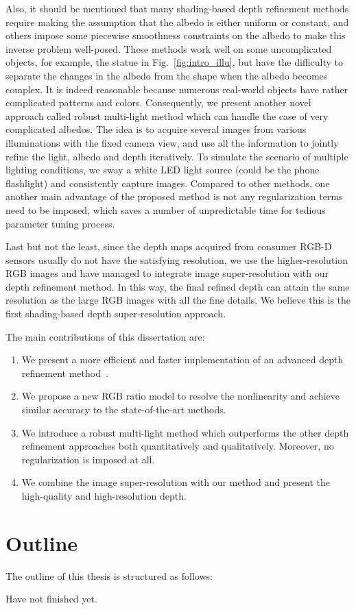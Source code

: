 Also, it should be mentioned that many shading-based depth refinement methods require making the assumption that the albedo is either uniform or constant, and others impose some piecewise smoothness constraints on the albedo to make this inverse problem well-posed.
These methods work well on some uncomplicated objects, for example, the statue in Fig.~\ref{fig:intro_illu}, but have the difficulty to separate the changes in the albedo from the shape when the albedo becomes complex.
It is indeed reasonable because numerous real-world objects have rather complicated patterns and colors.
Consequently, we present another novel approach called robust multi-light method which can handle the case of very complicated albedos.
The idea is to acquire several images from various illuminations with the fixed camera view, and use all the information to jointly refine the light, albedo and depth iteratively.
To simulate the scenario of multiple lighting conditions, we sway a white LED light source (could be the phone flashlight) and consistently capture images. 
Compared to other methods, one another main advantage of the proposed method is not any regularization terms need to be imposed, which saves a number of unpredictable time for tedious parameter tuning process.

Last but not the least, since the depth maps acquired from consumer RGB-D sensors usually do not have the satisfying resolution, we use the higher-resolution RGB images and have managed to integrate image super-resolution with our depth refinement method.
In this way, the final refined depth can attain the same resolution as the large RGB images with all the fine details.
We believe this is the first shading-based depth super-resolution approach.

The main contributions of this dissertation are:
\begin{enumerate}
    \item We present a more efficient and faster implementation of an advanced depth refinement method~\cite{or2015rgbd}.
    \item We propose a new RGB ratio model to resolve the nonlinearity and achieve similar accuracy to the state-of-the-art methods.
    \item We introduce a robust multi-light method which outperforms the other depth refinement approaches both quantitatively and qualitatively. Moreover, no regularization is imposed at all.
    \item We combine the image super-resolution with our method and present the high-quality and high-resolution depth.
\end{enumerate}


\section{Outline}
The outline of this thesis is structured as follows:

Have not finished yet.
